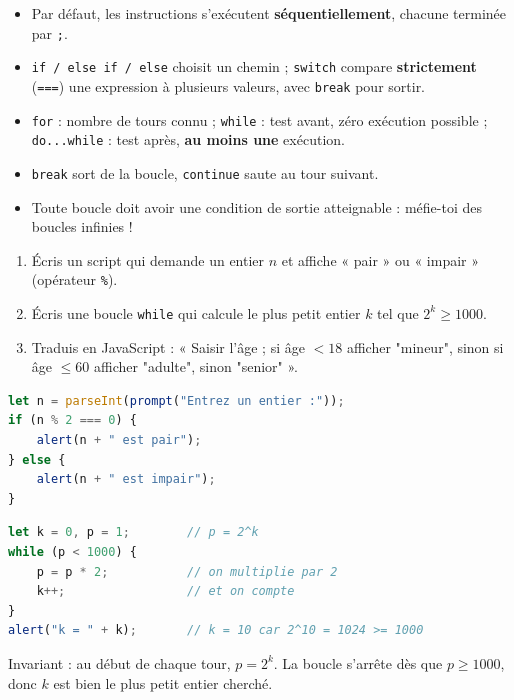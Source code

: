 \documentclass[11pt]{article}
\begin{document}
\begin{aretenir}
\begin{itemize}
\item Par défaut, les instructions s'exécutent \textbf{séquentiellement}, chacune terminée par \texttt{;}.
\item \texttt{if / else if / else} choisit un chemin ; \texttt{switch} compare \textbf{strictement} (\texttt{===}) une expression à plusieurs valeurs, avec \texttt{break} pour sortir.
\item \texttt{for} : nombre de tours connu ; \texttt{while} : test avant, zéro exécution possible ; \texttt{do...while} : test après, \textbf{au moins une} exécution.
\item \texttt{break} sort de la boucle, \texttt{continue} saute au tour suivant.
\item Toute boucle doit avoir une condition de sortie atteignable : méfie-toi des boucles infinies !
\end{itemize}
\end{aretenir}

\begin{exercice}
\begin{enumerate}
\item Écris un script qui demande un entier $n$ et affiche « pair » ou « impair » (opérateur \texttt{\%}).
\item Écris une boucle \texttt{while} qui calcule le plus petit entier $k$ tel que $2^k \ge 1000$.
\item Traduis en JavaScript : « Saisir l'âge ; si âge $< 18$ afficher "mineur", sinon si âge $\le 60$ afficher "adulte", sinon "senior" ».
\end{enumerate}
\end{exercice}

\begin{corrige}[Exercice n°1]
\begin{lstlisting}[language=JavaScript]
let n = parseInt(prompt("Entrez un entier :"));
if (n % 2 === 0) {
    alert(n + " est pair");
} else {
    alert(n + " est impair");
}
\end{lstlisting}
\end{corrige}

\begin{corrige}[Exercice n°2]
\begin{lstlisting}[language=JavaScript]
let k = 0, p = 1;        // p = 2^k
while (p < 1000) {
    p = p * 2;           // on multiplie par 2
    k++;                 // et on compte
}
alert("k = " + k);       // k = 10 car 2^10 = 1024 >= 1000
\end{lstlisting}
Invariant : au début de chaque tour, $p = 2^k$. La boucle s'arrête dès que $p \ge 1000$, donc $k$ est bien le plus petit entier cherché.
\end{corrige}
\end{document}
